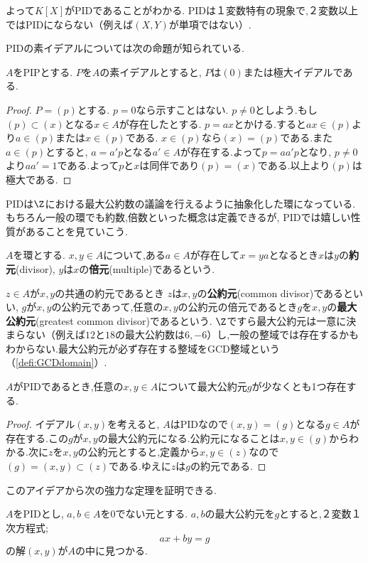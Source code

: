 よって$K[X]$がPIDであることがわかる. PIDは１変数特有の現象で,２変数以上ではPIDにならない（例えば$(X,Y)$が単項ではない）.

PIDの素イデアルについては次の命題が知られている.
\begin{prop}
	$A$をPIPとする. $P$を$A$の素イデアルとすると, $P$は$(0)$または極大イデアルである.
\end{prop}
\begin{proof}
	$P=(p)$とする. $p=0$なら示すことはない. $p\neq0$としよう.もし$(p)\subset (x)$となる$x\in A$が存在したとする. $p=ax$とかける.すると$ax\in (p)$より$a\in (p)$または$x\in (p)$である.  $x\in (p)$なら$(x)=(p)$である.また$a\in (p)$とすると, $a=a'p$となる$a'\in A$が存在する.よって$p=aa'p$となり, $p\neq0$より$aa'=1$である.よって$p$と$x$は同伴であり$(p)=(x)$である.以上より$(p)$は極大である.
\end{proof}

PIDは$\Z$における最大公約数の議論を行えるように抽象化した環になっている.もちろん一般の環でも約数,倍数といった概念は定義できるが, PIDでは嬉しい性質があることを見ていこう. 

\begin{defi}[約元,倍元]
	$A$を環とする. $x,y\in A$について,ある$a\in A$が存在して$x=ya$となるとき$x$は$y$の\textbf{約元}(divisor), $y$は$x$の\textbf{倍元}(multiple)であるという.
\end{defi}

$z\in A$が$x,y$の共通の約元であるとき $z$は$x,y$の\textbf{公約元}(common divisor)であるといい, $g$が$x,y$の公約元であって,任意の$x,y$の公約元の倍元であるとき$g$を$x,y$の\textbf{最大公約元}(greatest common divisor)であるという. $\Z$ですら最大公約元は一意に決まらない（例えば$12$と$18$の最大公約数は$6,-6$）し,一般の整域では存在するかもわからない.最大公約元が必ず存在する整域をGCD整域という（\ref{defi:GCDdomain}）.

\begin{prop}
	$A$がPIDであるとき,任意の$x,y\in A$について最大公約元$g$が少なくとも1つ存在する.
\end{prop}

\begin{proof}
	イデアル$(x,y)$を考えると, $A$はPIDなので$(x,y)=(g)$となる$g\in A$が存在する.この$g$が$x,y$の最大公約元になる.公約元になることは$x,y\in(g)$からわかる.次に$z$を$x,y$の公約元とすると,定義から$x,y\in (z)$なので$(g)=(x,y)\subset (z)$である.ゆえに$z$は$g$の約元である.
\end{proof}

このアイデアから次の強力な定理を証明できる.
\begin{thm}
	$A$をPIDとし, $a,b\in A$を0でない元とする. $a,b$の最大公約元を$g$とすると,２変数１次方程式;
	\[ax+by=g\]
	の解$(x,y)$が$A$の中に見つかる.
\end{thm}

